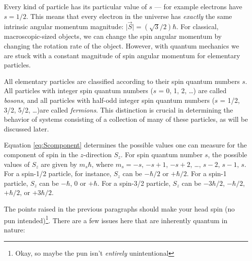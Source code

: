 Every kind of particle has its particular value of $s$ --- for example electrons
have $s=1/2$.  This means that every electron in the universe
has {\em exactly} the same intrinsic angular momentum magnitude: $\vert \vec{S}\vert = (\sqrt{3}/2)\hbar$.  For classical, macroscopic-sized objects, we can change the spin angular momentum
by changing the rotation rate of the object. However, with quantum mechanics we are stuck 
with a constant magnitude of spin angular momentum for elementary 
particles.

All elementary particles are classified according to their spin quantum numbers $s$.  All particles with integer spin quantum
numbers ($s$ = 0, 1, 2, \dots ) are called {\it bosons\/}, and all
particles with half-odd integer spin quantum numbers ($s$ = 1/2,
3/2, 5/2, \dots )are called {\it fermions\/}.  This distinction is
crucial in determining the behavior of systems consisting of a collection of many of these particles, as will be discussed later.

Equation \ref{eq:Scomponent} determines the possible values one can measure for the component of spin in the $z$-direction $S_z$.
For spin quantum number $s$, the possible values of $S_z$ are
given by $m_s\hbar$, where $m_s = -s$, $-s+1$, $-s+2$, \dots, $s-2$, $s-1$,
$s$. For a spin-1/2 particle, for instance, $S_z$ can be $-\hbar/2$
or $+\hbar/2$. For a spin-1 particle, $S_z$ can be $-\hbar$, 0 or
$+\hbar$. For a spin-3/2 particle, $S_z$ can be $-3\hbar/2$,
$-\hbar/2$, $+\hbar/2$, or $+3\hbar/2$.

The points raised in the previous paragraphs should make your head
spin (no pun intended)\footnote{Okay, so maybe the pun isn't {\it
entirely\/} unintentional}.  There are a few issues here that are
inherently quantum in nature:

